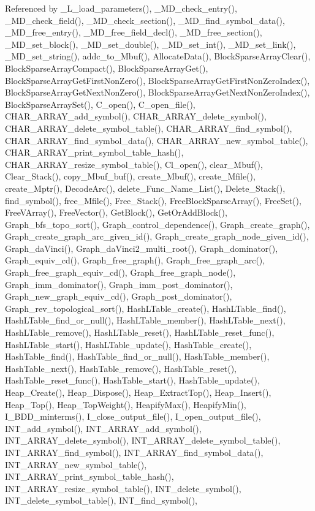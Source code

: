 Referenced by \_\-L\_\-load\_\-parameters(), \_\-MD\_\-check\_\-entry(), \_\-MD\_\-check\_\-field(), \_\-MD\_\-check\_\-section(), \_\-MD\_\-find\_\-symbol\_\-data(), \_\-MD\_\-free\_\-entry(), \_\-MD\_\-free\_\-field\_\-decl(), \_\-MD\_\-free\_\-section(), \_\-MD\_\-set\_\-block(), \_\-MD\_\-set\_\-double(), \_\-MD\_\-set\_\-int(), \_\-MD\_\-set\_\-link(), \_\-MD\_\-set\_\-string(), addc\_\-to\_\-Mbuf(), Allocate\-Data(), Block\-Sparse\-Array\-Clear(), Block\-Sparse\-Array\-Compact(), Block\-Sparse\-Array\-Get(), Block\-Sparse\-Array\-Get\-First\-Non\-Zero(), Block\-Sparse\-Array\-Get\-First\-Non\-Zero\-Index(), Block\-Sparse\-Array\-Get\-Next\-Non\-Zero(), Block\-Sparse\-Array\-Get\-Next\-Non\-Zero\-Index(), Block\-Sparse\-Array\-Set(), C\_\-open(), C\_\-open\_\-file(), CHAR\_\-ARRAY\_\-add\_\-symbol(), CHAR\_\-ARRAY\_\-delete\_\-symbol(), CHAR\_\-ARRAY\_\-delete\_\-symbol\_\-table(), CHAR\_\-ARRAY\_\-find\_\-symbol(), CHAR\_\-ARRAY\_\-find\_\-symbol\_\-data(), CHAR\_\-ARRAY\_\-new\_\-symbol\_\-table(), CHAR\_\-ARRAY\_\-print\_\-symbol\_\-table\_\-hash(), CHAR\_\-ARRAY\_\-resize\_\-symbol\_\-table(), Cl\_\-open(), clear\_\-Mbuf(), Clear\_\-Stack(), copy\_\-Mbuf\_\-buf(), create\_\-Mbuf(), create\_\-Mfile(), create\_\-Mptr(), Decode\-Arc(), delete\_\-Func\_\-Name\_\-List(), Delete\_\-Stack(), find\_\-symbol(), free\_\-Mfile(), Free\_\-Stack(), Free\-Block\-Sparse\-Array(), Free\-Set(), Free\-VArray(), Free\-Vector(), Get\-Block(), Get\-Or\-Add\-Block(), Graph\_\-bfs\_\-topo\_\-sort(), Graph\_\-control\_\-dependence(), Graph\_\-create\_\-graph(), Graph\_\-create\_\-graph\_\-arc\_\-given\_\-id(), Graph\_\-create\_\-graph\_\-node\_\-given\_\-id(), Graph\_\-da\-Vinci(), Graph\_\-da\-Vinci2\_\-multi\_\-root(), Graph\_\-dominator(), Graph\_\-equiv\_\-cd(), Graph\_\-free\_\-graph(), Graph\_\-free\_\-graph\_\-arc(), Graph\_\-free\_\-graph\_\-equiv\_\-cd(), Graph\_\-free\_\-graph\_\-node(), Graph\_\-imm\_\-dominator(), Graph\_\-imm\_\-post\_\-dominator(), Graph\_\-new\_\-graph\_\-equiv\_\-cd(), Graph\_\-post\_\-dominator(), Graph\_\-rev\_\-topological\_\-sort(), Hash\-LTable\_\-create(), Hash\-LTable\_\-find(), Hash\-LTable\_\-find\_\-or\_\-null(), Hash\-LTable\_\-member(), Hash\-LTable\_\-next(), Hash\-LTable\_\-remove(), Hash\-LTable\_\-reset(), Hash\-LTable\_\-reset\_\-func(), Hash\-LTable\_\-start(), Hash\-LTable\_\-update(), Hash\-Table\_\-create(), Hash\-Table\_\-find(), Hash\-Table\_\-find\_\-or\_\-null(), Hash\-Table\_\-member(), Hash\-Table\_\-next(), Hash\-Table\_\-remove(), Hash\-Table\_\-reset(), Hash\-Table\_\-reset\_\-func(), Hash\-Table\_\-start(), Hash\-Table\_\-update(), Heap\_\-Create(), Heap\_\-Dispose(), Heap\_\-Extract\-Top(), Heap\_\-Insert(), Heap\_\-Top(), Heap\_\-Top\-Weight(), Heapify\-Max(), Heapify\-Min(), I\_\-BDD\_\-minterms(), I\_\-close\_\-output\_\-file(), I\_\-open\_\-output\_\-file(), INT\_\-add\_\-symbol(), INT\_\-ARRAY\_\-add\_\-symbol(), INT\_\-ARRAY\_\-delete\_\-symbol(), INT\_\-ARRAY\_\-delete\_\-symbol\_\-table(), INT\_\-ARRAY\_\-find\_\-symbol(), INT\_\-ARRAY\_\-find\_\-symbol\_\-data(), INT\_\-ARRAY\_\-new\_\-symbol\_\-table(), INT\_\-ARRAY\_\-print\_\-symbol\_\-table\_\-hash(), INT\_\-ARRAY\_\-resize\_\-symbol\_\-table(), INT\_\-delete\_\-symbol(), INT\_\-delete\_\-symbol\_\-table(), INT\_\-find\_\-symbol(), 